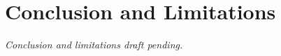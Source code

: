 \section{Conclusion and Limitations}
\label{sec:conclusion}
\textit{Conclusion and limitations draft pending.}
